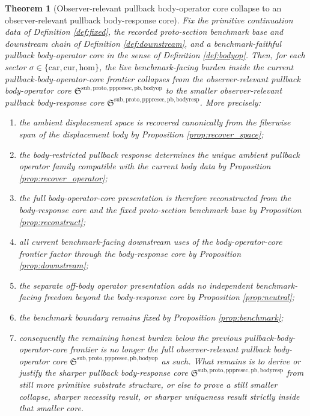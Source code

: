 \documentclass[11pt]{article}
\newcommand{\Car}{\mathrm{car}}
\newcommand{\Cur}{\mathrm{cur}}
\newcommand{\Hom}{\mathrm{hom}}
\newcommand{\PullbackBodyOperatorCore}{\mathfrak S^{\mathrm{sub,proto,pppresec,pb,bodyop}}}
\newcommand{\PullbackBodyResponseCore}{\mathfrak S^{\mathrm{sub,proto,pppresec,pb,bodyresp}}}
\newtheorem{theorem}{Theorem}
\begin{document}
\begin{theorem}[Observer-relevant pullback body-operator core collapse to an observer-relevant pullback body-response core]
\label{thm:main}
Fix the primitive continuation data of Definition \ref{def:fixed}, the recorded proto-section benchmark base and downstream chain of Definition \ref{def:downstream}, and a benchmark-faithful pullback body-operator core in the sense of Definition \ref{def:bodyop}. Then, for each sector \(\sigma\in\{\Car,\Cur,\Hom\}\), the live benchmark-facing burden inside the current pullback-body-operator-core frontier collapses from the observer-relevant pullback body-operator core \(\PullbackBodyOperatorCore\) to the smaller observer-relevant pullback body-response core \(\PullbackBodyResponseCore\). More precisely:
\begin{enumerate}
    \item the ambient displacement space is recovered canonically from the fiberwise span of the displacement body by Proposition \ref{prop:recover_space};
    \item the body-restricted pullback response determines the unique ambient pullback operator family compatible with the current body data by Proposition \ref{prop:recover_operator};
    \item the full body-operator-core presentation is therefore reconstructed from the body-response core and the fixed proto-section benchmark base by Proposition \ref{prop:reconstruct};
    \item all current benchmark-facing downstream uses of the body-operator-core frontier factor through the body-response core by Proposition \ref{prop:downstream};
    \item the separate off-body operator presentation adds no independent benchmark-facing freedom beyond the body-response core by Proposition \ref{prop:neutral};
    \item the benchmark boundary remains fixed by Proposition \ref{prop:benchmark};
    \item consequently the remaining honest burden below the previous pullback-body-operator-core frontier is no longer the full observer-relevant pullback body-operator core \(\PullbackBodyOperatorCore\) as such. What remains is to derive or justify the sharper pullback body-response core \(\PullbackBodyResponseCore\) from still more primitive substrate structure, or else to prove a still smaller collapse, sharper necessity result, or sharper uniqueness result strictly inside that smaller core.
\end{enumerate}
\end{theorem}
\end{document}
